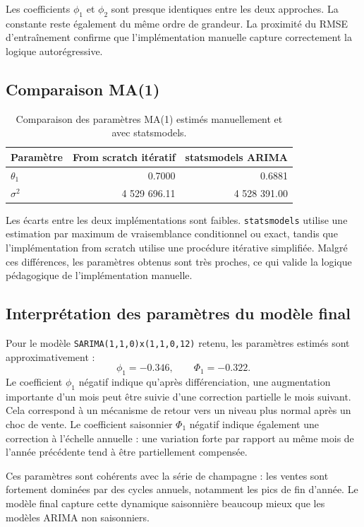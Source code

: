 \documentclass[12pt,a4paper]{report}
\begin{document}
Les coefficients $\phi_1$ et $\phi_2$ sont presque identiques entre les deux approches. La constante reste également du même ordre de grandeur. La proximité du RMSE d'entraînement confirme que l'implémentation manuelle capture correctement la logique autorégressive.

\subsection{Comparaison MA(1)}
\begin{table}[H]
\centering
\begin{tabular}{lrr}
\toprule
Paramètre & From scratch itératif & statsmodels ARIMA \\
\midrule
$\theta_1$ & 0.7000 & 0.6881 \\
$\sigma^2$ & 4 529 696.11 & 4 528 391.00 \\
\bottomrule
\end{tabular}
\caption{Comparaison des paramètres MA(1) estimés manuellement et avec statsmodels.}
\end{table}

Les écarts entre les deux implémentations sont faibles. \texttt{statsmodels} utilise une estimation par maximum de vraisemblance conditionnel ou exact, tandis que l'implémentation from scratch utilise une procédure itérative simplifiée. Malgré ces différences, les paramètres obtenus sont très proches, ce qui valide la logique pédagogique de l'implémentation manuelle.

\subsection{Interprétation des paramètres du modèle final}
Pour le modèle \texttt{SARIMA(1,1,0)x(1,1,0,12)} retenu, les paramètres estimés sont approximativement :
\[
\phi_1=-0.346, \qquad \Phi_1=-0.322.
\]
Le coefficient $\phi_1$ négatif indique qu'après différenciation, une augmentation importante d'un mois peut être suivie d'une correction partielle le mois suivant. Cela correspond à un mécanisme de retour vers un niveau plus normal après un choc de vente. Le coefficient saisonnier $\Phi_1$ négatif indique également une correction à l'échelle annuelle : une variation forte par rapport au même mois de l'année précédente tend à être partiellement compensée.

Ces paramètres sont cohérents avec la série de champagne : les ventes sont fortement dominées par des cycles annuels, notamment les pics de fin d'année. Le modèle final capture cette dynamique saisonnière beaucoup mieux que les modèles ARIMA non saisonniers.
\end{document}
